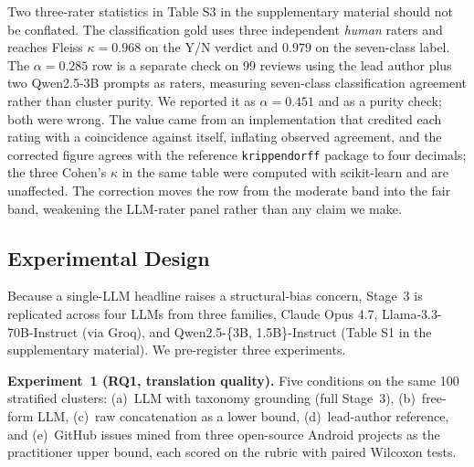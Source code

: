 \documentclass[preprint,12pt]{elsarticle}
\begin{document}
Two three-rater statistics in Table S3 in the supplementary material should not be conflated. The
classification gold uses three independent \emph{human} raters and reaches Fleiss $\kappa = 0.968$
on the Y/N verdict and $0.979$ on the seven-class label. The $\alpha = 0.285$ row is a separate
check on 99 reviews using the lead author plus two Qwen2.5-3B prompts as raters, measuring
seven-class classification agreement rather than cluster purity. We reported it as $\alpha =
0.451$ and as a purity check; both were wrong. The value came from an implementation that credited
each rating with a coincidence against itself, inflating observed agreement, and the corrected
figure agrees with the reference \texttt{krippendorff} package to four decimals; the three Cohen's
$\kappa$ in the same table were computed with scikit-learn and are unaffected. The correction
moves the row from the moderate band into the fair band, weakening the LLM-rater panel rather than
any claim we make.

\subsection{Experimental Design}
Because a single-LLM headline raises a structural-bias concern, Stage~3 is replicated across four
LLMs from three families, Claude Opus 4.7, Llama-3.3-70B-Instruct (via Groq), and
Qwen2.5-\{3B, 1.5B\}-Instruct (Table S1 in the supplementary material). We pre-register three experiments.

\textbf{Experiment~1 (RQ1, translation quality).} Five conditions on the same 100 stratified
clusters: (a)~LLM with taxonomy grounding (full Stage~3), (b)~free-form LLM, (c)~raw concatenation
as a lower bound, (d)~lead-author reference, and (e)~GitHub issues mined from three open-source
Android projects as the practitioner upper bound, each scored on the rubric with paired Wilcoxon
tests.
\end{document}
